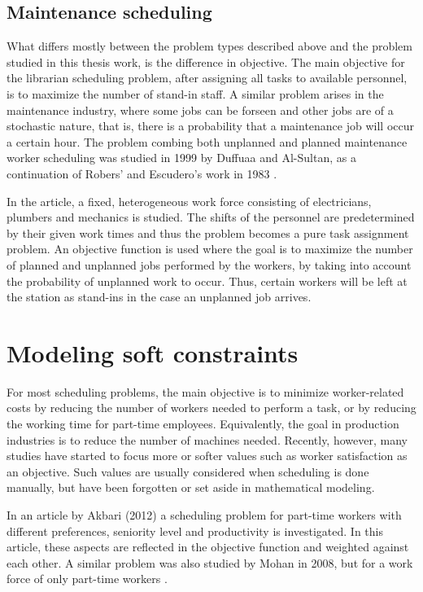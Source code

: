 \subsection{Maintenance scheduling}
What differs mostly between the problem types described above and the problem studied in this thesis work, is the difference in objective. The main objective for the librarian scheduling problem, after assigning all tasks to available personnel, is to maximize the number of stand-in staff. A similar problem arises in the maintenance industry, where some jobs can be forseen and other jobs are of a stochastic nature, that is, there is a probability that a maintenance job will occur a certain hour. The problem combing both unplanned and planned maintenance worker scheduling was studied in 1999 by Duffuaa and Al-Sultan, as a continuation of Robers' and Escudero's work in 1983 \citet{duffuaa_1999} \citet{roberts_1983}. 

In the article, a fixed, heterogeneous work force consisting of electricians, plumbers and mechanics is studied. The shifts of the personnel are predetermined by their given work times and thus the problem becomes a pure task assignment problem. An objective function is used where the goal is to maximize the number of planned and unplanned jobs performed by the workers, by taking into account the probability of unplanned work to occur. Thus, certain workers will be left at the station as stand-ins in the case an unplanned job arrives.


\section{Modeling soft constraints} \label{WLA}
For most scheduling problems, the main objective is to minimize worker-related costs by reducing the number of workers needed to perform a task, or by reducing the working time for part-time employees. Equivalently, the goal in production industries is to reduce the number of machines needed. Recently, however, many studies have started to focus more or softer values such as worker satisfaction as an objective. Such values are usually considered when scheduling is done manually, but have been forgotten or set aside in mathematical modeling.

 In an article by Akbari (2012)  \citet{akbari_2012} a scheduling problem for part-time workers with different preferences, seniority level and productivity is investigated. In this article, these aspects are reflected in the objective function and weighted against each other. A similar problem was also studied by Mohan in 2008, but for a work force of only part-time workers \citet{mohan_2008}. %

